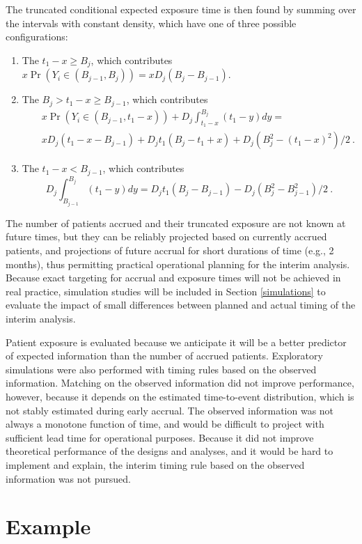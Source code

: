 \documentclass[12pt]{article}
\begin{document}
The truncated conditional expected exposure time is then found by summing over the intervals with constant density, which have one of three possible configurations:

\begin{enumerate}
\item
The $t_1-x\geq B_j$, which contributes $x\Pr(Y_i\in (B_{j-1},B_j))=xD_j(B_j-B_{j-1})$.
\item
The $B_j>t_1-x\geq B_{j-1}$, which contributes
\begin{eqnarray*}
&&x\Pr(Y_i\in (B_{j-1},t_1-x))+D_j\int_{t_1-x}^{B_j}(t_1-y)dy = \\
&&xD_j(t_1-x-B_{j-1}) + D_j t_1(B_j-t_1+x) + D_j(B_j^2-(t_1-x)^2)/2 \ .
\end{eqnarray*}
\item
The $t_1-x<B_{j-1}$, which contributes
\begin{displaymath}
D_j\int_{B_{j-1}}^{B_j}(t_1-y)dy=D_jt_1(B_j-B_{j-1})-D_j(B_j^2-B_{j-1}^2)/2 \ .
\end{displaymath}
\end{enumerate}

The number of patients accrued and their truncated exposure are not known at future times, but they
can be reliably projected based on currently accrued patients, and projections of future accrual
for short durations of time (e.g., 2 months), thus permitting practical operational planning for
the interim analysis.  Because exact targeting for accrual and exposure times will not be achieved
in real practice, simulation studies will be included in Section \ref{simulations} to evaluate the
impact of small differences between planned and actual timing of the interim analysis.

Patient exposure is evaluated because we anticipate it will be a better predictor of expected
information than the number of accrued patients.  Exploratory simulations were also performed with
timing rules based on the observed information.  Matching on the observed information did not
improve performance, however, because it depends on the estimated time-to-event distribution, which
is not stably estimated during early accrual.  The observed information was not always a monotone
function of time, and would be difficult to project with sufficient lead time for operational
purposes. Because it did not improve theoretical performance of the designs and analyses, and it
would be hard to implement and explain, the interim timing rule based on the observed information
was not pursued.
\section{Example}
\label{example}
\end{document}
